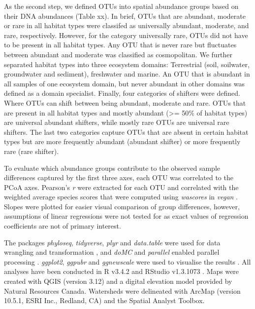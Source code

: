 \documentclass[12pt,a4paper]{article} %
\begin{document}
As the second step, we defined OTUs into spatial abundance groups based on their DNA abundances (Table xx). In brief, OTUs that are abundant, moderate or rare in all habitat types were classifed as universally abundant, moderate, and rare, respectively. However, for the category universally rare, OTUs did not have to be present in all habitat types. Any OTU that is never rare but fluctuates between abundant and moderate was classified as cosmopolitan. We further separated habitat types into three ecosystem domains: Terrestrial (soil, soilwater, groundwater and sediment), freshwater and marine. An OTU that is abundant in all samples of one ecosystem domain, but never abundant in other domains was defined as a domain specialist. Finally, four categories of shifters were defined. Where OTUs can shift between being abundant, moderate and rare. OTUs that are present in all habitat types and mostly abundant (>= 50\% of habitat types) are universal abundant shifters, while mostly rare OTUs are universal rare shifters. The last two categories capture OTUs that are absent in certain habitat types but are more frequently abundant (abundant shifter) or more frequently rare (rare shifter).

To evaluate which abundance groups contribute to the observed sample differences captured by the first three axes, each OTU was correlated to the PCoA axes. Pearson's \textit{r} were extracted for each OTU and correlated with the weighted average species scores that were computed using \textit{wascores} in \textit{vegan} \citep{Oksanen2017}. Slopes were plotted for easier visual comparison of group differences, however, assumptions of linear regressions were not tested for as exact values of regression coefficients are not of primary interest.

The packages \textit{phyloseq}, \textit{tidyverse}, \textit{plyr} and \textit{data.table} were used for data wrangling and transformation \citep{McMurdie2013,Wickham2019, Wickham2011, Dowle2019}, and \textit{doMC} and \textit{parallel} enabled parallel processing \citep{Analytics2019, RCoreTeam2017}. \textit{ggplot2}, \textit{ggpubr} and \textit{ggnewscale} were used to visualise the results \citep{Wickham2016, Kassambara2018, Campitelli2020}. All analyses have been conducted in R v3.4.2 \citep{RCoreTeam2017} and RStudio v1.3.1073 \citep{RStudioTeam2016}. Maps were created with QGIS (version 3.12) and a digital elevation model provided by Natural Resources Canada. Watersheds were delineated with ArcMap (version 10.5.1, ESRI Inc., Redland, CA) and the Spatial Analyst Toolbox. 
\end{document}
